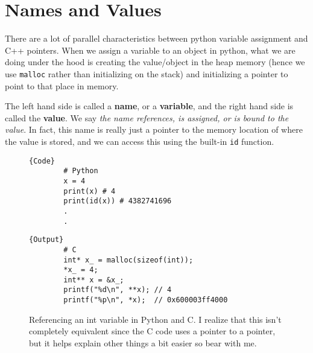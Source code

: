 \section{Names and Values}

  There are a lot of parallel characteristics between python variable assignment and C++ pointers. When we assign a variable to an object in python, what we are doing under the hood is creating the value/object in the heap memory (hence we use \texttt{malloc} rather than initializing on the stack) and initializing a pointer to point to that place in memory. 

  The left hand side is called a \textbf{name}, or a \textbf{variable}, and the right hand side is called the \textbf{value}. We say \textit{the name references, is assigned, or is bound to the value}. In fact, this name is really just a pointer to the memory location of where the value is stored, and we can access this using the built-in \texttt{id} function. 

  \begin{figure}[H]
    \centering 
    \begin{minipage}{.5\textwidth}
      \begin{lstlisting}[]{Code}
        # Python 
        x = 4
        print(x) # 4
        print(id(x)) # 4382741696
        .
        .
      \end{lstlisting}
      \end{minipage}
      \hfill
      \begin{minipage}{.49\textwidth}
      \begin{lstlisting}[]{Output}
        # C  
        int* x_ = malloc(sizeof(int)); 
        *x_ = 4; 
        int** x = &x_; 
        printf("%d\n", **x); // 4
        printf("%p\n", *x);  // 0x600003ff4000
      \end{lstlisting}
    \end{minipage}
    \caption{Referencing an int variable in Python and C. I realize that this isn't completely equivalent since the C code uses a pointer to a pointer, but it helps explain other things a bit easier so bear with me. } 
    \label{fig:int}
  \end{figure}

